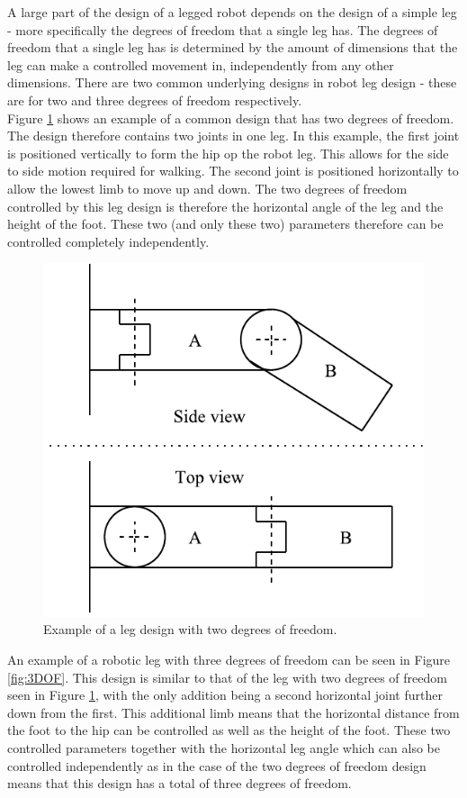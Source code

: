 A large part of the design of a legged robot depends on the design of a simple leg - more specifically the degrees of freedom that a single leg has. The degrees of freedom that a single leg has is determined by the amount of dimensions that the leg can make a controlled movement in, independently from any other dimensions. There are two common underlying designs in robot leg design - these are for two and three degrees of freedom respectively.\\

Figure \ref{fig:2DOF} shows an example of a common design that has two degrees of freedom. The design therefore contains two joints in one leg. In this example, the first joint is positioned vertically to form the hip op the robot leg. This allows for the side to side motion required for walking. The second joint is positioned horizontally to allow the lowest limb to move up and down. The two degrees of freedom controlled by this leg design is therefore the horizontal angle of the leg and the height of the foot. These two (and only these two) parameters therefore can be controlled completely independently.
\FloatBarrier
\begin{figure}[h]
\centering
\includegraphics[scale = 1]{pics/2DOF.pdf}
\caption{Example of a leg design with two degrees of freedom.}
\label{fig:2DOF}
\end{figure}
\FloatBarrier
An example of a robotic leg with three degrees of freedom can be seen in Figure \ref{fig:3DOF}. This design is similar to that of the leg with two degrees of freedom seen in Figure \ref{fig:2DOF}, with the only addition being a second horizontal joint further down from the first. This additional limb means that the horizontal distance from the foot to the hip can be controlled as well as the height of the foot. These two controlled parameters together with the horizontal leg angle which can also be controlled independently as in the case of the two degrees of freedom design means that this design has a total of three degrees of freedom.
